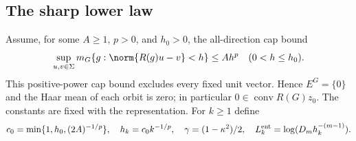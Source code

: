 \subsection{The sharp lower law}
Assume, for some $A\ge1$, $p>0$, and $h_0>0$, the all-direction cap
bound
\begin{equation}\label{eq:allcaps61}
 \sup_{u,v\in\Sigma}m_G\{g:\norm{R(g)u-v}<h\}
                          \le Ah^p\quad(0<h\le h_0).
\end{equation}
This positive-power cap bound excludes every fixed unit vector. Hence
$E^G=\{0\}$ and the Haar mean of each orbit is zero; in particular
$0\in\operatorname{conv}R(G)z_0$. The constants are fixed with the
representation. For $k\ge1$ define
\begin{equation}\label{eq:parameters61}
 c_0=\min\{1,h_0,(2A)^{-1/p}\},\quad h_k=c_0k^{-1/p},\quad
 \gamma=(1-\kappa^2)/2,\quad L_k^{\rm ent}=\log(D_mh_k^{-(m-1)}).
\end{equation}

